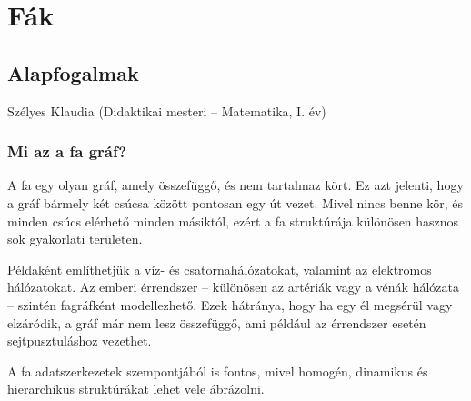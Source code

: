 
\chapter{Fák}\label{chap:fak}


\section{Alapfogalmak}\label{sec:fak_alapok}
\begin{description}
	{\large \item [{Szerző:}] Szélyes Klaudia (Didaktikai mesteri -- Matematika, I.
		év)}
\end{description}

\subsection*{Mi az a fa gráf?}

A fa egy olyan gráf, amely összefüggő, és nem tartalmaz kört. Ez azt
jelenti, hogy a gráf bármely két csúcsa között pontosan egy út vezet.
Mivel nincs benne kör, és minden csúcs elérhető minden másiktól, ezért
a fa struktúrája különösen hasznos sok gyakorlati területen.

Példaként említhetjük a víz- és csatornahálózatokat, valamint az elektromos
hálózatokat. Az emberi érrendszer -- különösen az artériák vagy a
vénák hálózata -- szintén fagráfként modellezhető. Ezek hátránya,
hogy ha egy él megsérül vagy elzáródik, a gráf már nem lesz összefüggő,
ami például az érrendszer esetén sejtpusztuláshoz vezethet.

A fa adatszerkezetek szempontjából is fontos, mivel homogén, dinamikus
és hierarchikus struktúrákat lehet vele ábrázolni.

